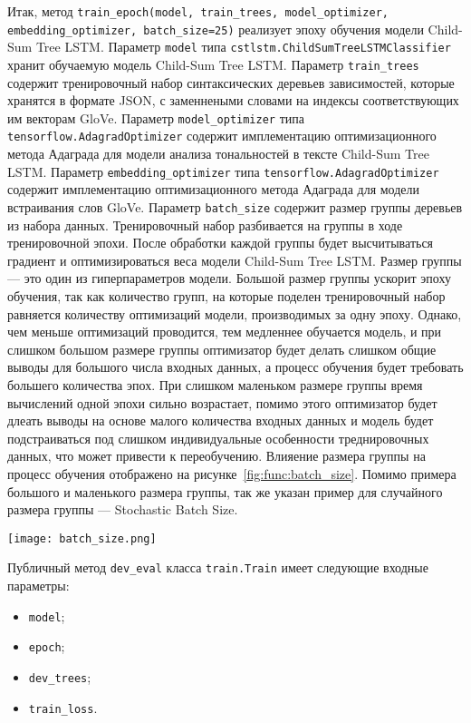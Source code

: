 Итак, метод \texttt{train\_epoch(model, train\_trees, model\_optimizer, embedding\_optimizer, batch\_size=25)} реализует эпоху обучения модели Child-Sum Tree LSTM\@. Параметр \texttt{model} типа \texttt{cstlstm.ChildSumTreeLSTMCla\-ssifier} хранит обучаемую модель Child-Sum Tree LSTM\@. Параметр \texttt{train\-\_trees} содержит тренировочный набор синтаксических деревьев зависимостей, которые хранятся в формате JSON\@, с заменнеными словами на индексы соответствующих им векторам GloVe. Параметр \texttt{model\_optimizer} типа \texttt{tensorflow.AdagradOptimizer} содержит имплементацию оптимизационного метода Адаграда для модели анализа тональностей в тексте Child-Sum Tree LSTM\@. Параметр \texttt{embedding\_optimizer} типа \texttt{tensorflow.AdagradOptimizer} содержит имплементацию оптимизационного метода Адаграда для модели встраивания слов GloVe. Параметр \texttt{batch\_size} содержит размер группы деревьев из набора данных. Тренировочный набор разбивается на группы в ходе тренировочной эпохи. После обработки каждой группы будет высчитываться градиент и оптимизироваться веса модели Child-Sum Tree LSTM\@. Размер группы --- это один из гиперпараметров модели. Большой размер группы ускорит эпоху обучения, так как количество групп, на которые поделен тренировочный набор равняется количеству оптимизаций модели, производимых за одну эпоху. Однако, чем меньше оптимизаций проводится, тем медленнее обучается модель, и при слишком большом размере группы оптимизатор будет делать слишком общие выводы для большого числа входных данных, а процесс обучения будет требовать большего количества эпох. При слишком маленьком размере группы время вычислений одной эпохи сильно возрастает, помимо этого оптимизатор будет длеать выводы на основе малого количества входных данных и модель будет подстраиваться под слишком индивидуальные особенности треднировочных данных, что может привести к переобучению. Влияение размера группы на процесс обучения отображено на рисунке~\ref{fig:func:batch_size}. Помимо примера большого и маленького размера группы, так же указан пример для случайного размера группы --- Stochastic Batch Size.

\begin{center}
  \texttt{[image: batch\_size.png]}
  \label{fig:func:batch_size}
\end{center}

Публичный метод \texttt{dev\_eval} класса \texttt{train.Train} имеет следующие входные параметры:
\begin{itemize}
\item \texttt{model};
\item \texttt{epoch};
\item \texttt{dev\_trees};
\item \texttt{train\_loss}.
\end{itemize}

